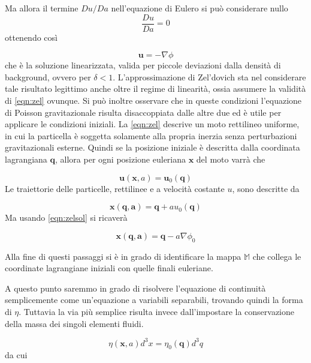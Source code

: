 Ma allora il termine $Du/Da$ nell'equazione di Eulero si può considerare nullo
\begin{equation}
    \label{eqn:zel}
    \frac{Du}{Da} = 0
\end{equation}
ottenendo così

\begin{equation}
    \label{eqn:zelsol}
    \bm{u} = -\nabla\phi
\end{equation}
che è la soluzione linearizzata, valida per piccole deviazioni dalla densità di background, ovvero per $\delta < 1$.
L'approssimazione di Zel'dovich sta nel considerare tale risultato legittimo anche oltre il regime di linearità, ossia 
assumere la validità di \ref{eqn:zel} ovunque.
Si può inoltre osservare che in queste condizioni l'equazione di Poisson gravitazionale risulta disaccoppiata dalle
altre due ed è utile per applicare le condizioni iniziali.
La \ref{eqn:zel} descrive un moto rettilineo uniforme, in cui la particella è soggetta solamente alla propria inerzia
senza perturbazioni gravitazionali esterne. Quindi se la posizione iniziale è descritta dalla coordinata lagrangiana
$\bm{q}$, allora per ogni posizione euleriana $\bm{x}$ del moto varrà che 

\begin{equation}
    \bm{u}(\bm{x}, a) = \bm{u}_0(\bm{q})
\end{equation}
Le traiettorie delle particelle, rettilinee e a velocità costante $u$, sono descritte da

\begin{equation}
    \bm{x}(\bm{q, a}) = \bm{q} + a u_0(\bm{q})
\end{equation}
Ma usando \ref{eqn:zelsol} si ricaverà

\begin{equation}
    \label{eqn:zelmap}
    \bm{x}(\bm{q, a}) = \bm{q} - a \nabla\phi_0
\end{equation}

Alla fine di questi passaggi si è in grado di identificare la mappa $\mathbb{M}$ che collega le coordinate lagrangiane 
iniziali con quelle finali euleriane. 

A questo punto saremmo in grado di risolvere l'equazione di continuità semplicemente come un'equazione a variabili
separabili, trovando quindi la forma di $\eta$. Tuttavia la via più semplice risulta invece dall'impostare la 
conservazione della massa dei singoli elementi fluidi.

\begin{equation}
    \eta(\bm{x}, a)d^3x=\eta_0(\bm{q})d^3q
\end{equation}
da cui

